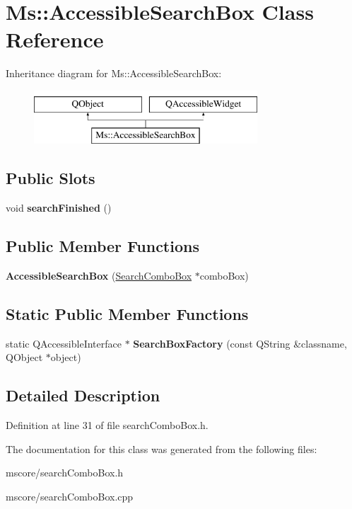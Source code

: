 \hypertarget{class_ms_1_1_accessible_search_box}{}\section{Ms\+:\+:Accessible\+Search\+Box Class Reference}
\label{class_ms_1_1_accessible_search_box}
Inheritance diagram for Ms\+:\+:Accessible\+Search\+Box\+:\begin{figure}[H]
\begin{center}
\leavevmode
\includegraphics[height=2.000000cm]{class_ms_1_1_accessible_search_box}
\end{center}
\end{figure}
\subsection*{Public Slots}
\begin{DoxyCompactItemize}
\item 
\mbox{\label{class_ms_1_1_accessible_search_box_a096a775b2468941ece953f7f5d77fa61}} 
void {\bfseries search\+Finished} ()
\end{DoxyCompactItemize}
\subsection*{Public Member Functions}
\begin{DoxyCompactItemize}
\item 
\mbox{\label{class_ms_1_1_accessible_search_box_a9ed256ecaafed7409f584d13b4d935b2}} 
{\bfseries Accessible\+Search\+Box} (\hyperlink{class_ms_1_1_search_combo_box}{Search\+Combo\+Box} $\ast$combo\+Box)
\end{DoxyCompactItemize}
\subsection*{Static Public Member Functions}
\begin{DoxyCompactItemize}
\item 
\mbox{\label{class_ms_1_1_accessible_search_box_a8b0e2ecd875fb26f75818ae47410fd85}} 
static Q\+Accessible\+Interface $\ast$ {\bfseries Search\+Box\+Factory} (const Q\+String \&classname, Q\+Object $\ast$object)
\end{DoxyCompactItemize}


\subsection{Detailed Description}


Definition at line 31 of file search\+Combo\+Box.\+h.



The documentation for this class was generated from the following files\+:\begin{DoxyCompactItemize}
\item 
mscore/search\+Combo\+Box.\+h\item 
mscore/search\+Combo\+Box.\+cpp\end{DoxyCompactItemize}

